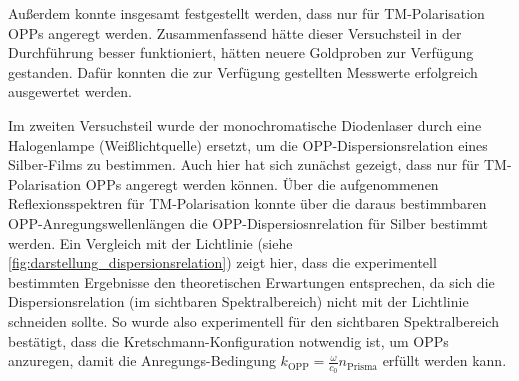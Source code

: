 Außerdem konnte insgesamt festgestellt werden, dass nur für TM-Polarisation OPPs angeregt werden.
Zusammenfassend hätte dieser Versuchsteil in der Durchführung besser funktioniert, hätten neuere Goldproben zur Verfügung gestanden. Dafür konnten
die zur Verfügung gestellten Messwerte erfolgreich ausgewertet werden.\par
Im zweiten Versuchsteil wurde der monochromatische Diodenlaser durch eine Halogenlampe (Weißlichtquelle) ersetzt, um die OPP-Dispersionsrelation eines
Silber-Films zu bestimmen. Auch hier hat sich zunächst gezeigt, dass
nur für TM-Polarisation OPPs angeregt werden können. Über die aufgenommenen Reflexionsspektren für TM-Polarisation konnte über die daraus bestimmbaren
OPP-Anregungswellenlängen die OPP-Dispersiosnrelation für Silber bestimmt werden. Ein Vergleich mit der Lichtlinie (siehe \cref{fig:darstellung_dispersionsrelation})
zeigt hier, dass die experimentell bestimmten Ergebnisse den theoretischen Erwartungen entsprechen, da sich die Dispersionsrelation (im sichtbaren Spektralbereich)
nicht mit der Lichtlinie schneiden sollte. So wurde also experimentell für den sichtbaren Spektralbereich bestätigt, dass die Kretschmann-Konfiguration
notwendig ist, um OPPs anzuregen, damit die Anregungs-Bedingung $k_{\mathrm{OPP}} = \frac{\omega}{c_0} n_{\mathrm{Prisma}}$ erfüllt werden kann.